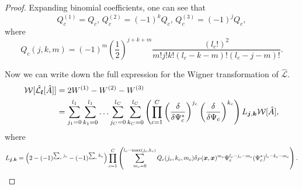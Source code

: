 \begin{proof}
Expanding binomial coefficients, one can see that
\[
	Q_c^{(1)} = Q_c,\, Q_c^{(2)} = (-1)^k Q_c,\, Q_c^{(3)} = (-1)^j Q_c,
\]
where
\[
	Q_c(j, k, m)
	= (-1)^m \left( \frac{1}{2} \right)^{j + k + m}
		\frac{(l_c!)^2}{m! j! k! (l_c - k - m)! (l_c - j - m)!}.
\]

Now we can write down the full expression for the Wigner transformation of $\hat{\mathcal{L}}$.
\begin{equation*}
\begin{split}
	\mathcal{W}[\hat{\mathcal{L}_{\boldsymbol{l}}}[\hat{A}]]
	& = 2 W^{(1)} - W^{(2)} - W^{(3)} \\
	& = \sum_{j_1=0}^{l_1} \sum_{k_1=0}^{l_1} \ldots
		\sum_{j_C=0}^{l_C} \sum_{k_C=0}^{l_C}
			\left(
				\prod_{c=1}^C
					\left( \frac{\delta}{\delta \Psi_c^*} \right)^{j_c}
					\left( \frac{\delta}{\delta \Psi_c} \right)^{k_c}
			\right)
			L_{\boldsymbol{j}, \boldsymbol{k}}
		\mathcal{W}[\hat{A}],
\end{split}
\end{equation*}
where
\[
	L_{\boldsymbol{j}, \boldsymbol{k}}
	= \left( 2 - (-1)^{\sum_c j_c} - (-1)^{\sum_c k_c} \right)
		\prod_{c=1}^C \left(
			\sum_{m_c=0}^{l_c - \max(j_c, k_c)}
			Q_c(j_c, k_c, m_c)
			\delta_P(\boldsymbol{x}, \boldsymbol{x})^{m_c}
			\Psi_c^{l_c - j_c - m_c}
			(\Psi_c^*)^{l_c - k_c - m_c}
		\right).
\]
\end{proof}
